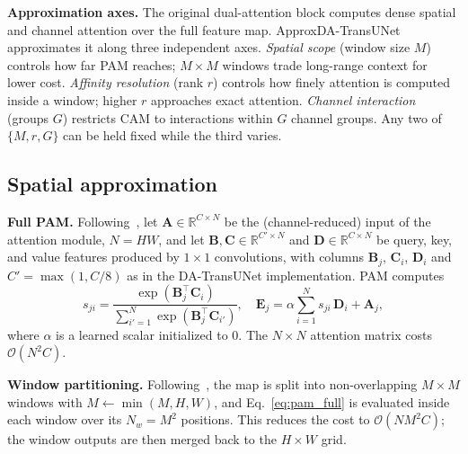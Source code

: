 \textbf{Approximation axes.} The original dual-attention block computes dense spatial and channel attention over the full feature map. ApproxDA-TransUNet approximates it along three independent axes. \emph{Spatial scope} (window size $M$) controls how far PAM reaches; $M{\times}M$ windows trade long-range context for lower cost. \emph{Affinity resolution} (rank $r$) controls how finely attention is computed inside a window; higher $r$ approaches exact attention. \emph{Channel interaction} (groups $G$) restricts CAM to interactions within $G$ channel groups. Any two of $\{M, r, G\}$ can be held fixed while the third varies.

\subsection{Spatial approximation}

\textbf{Full PAM.} Following~\cite{fu2019dual}, let $\mathbf{A} \in \mathbb{R}^{C \times N}$ be the (channel-reduced) input of the attention module, $N = HW$, and let $\mathbf{B}, \mathbf{C} \in \mathbb{R}^{C' \times N}$ and $\mathbf{D} \in \mathbb{R}^{C \times N}$ be query, key, and value features produced by $1{\times}1$ convolutions, with columns $\mathbf{B}_j$, $\mathbf{C}_i$, $\mathbf{D}_i$ and $C' = \max(1, C/8)$ as in the DA-TransUNet implementation. PAM computes
\begin{equation}
  s_{ji} = \frac{\exp(\mathbf{B}_j^{\top}\mathbf{C}_i)}{\sum_{i'=1}^{N}\exp(\mathbf{B}_j^{\top}\mathbf{C}_{i'})}, \quad
  \mathbf{E}_j = \alpha \sum_{i=1}^{N} s_{ji}\,\mathbf{D}_i + \mathbf{A}_j,
  \label{eq:pam_full}
\end{equation}
where $\alpha$ is a learned scalar initialized to 0. The $N{\times}N$ attention matrix costs $\mathcal{O}(N^2C)$.

\textbf{Window partitioning.} Following~\cite{liu2021swin}, the map is split into non-overlapping $M{\times}M$ windows with $M \leftarrow \min(M,H,W)$, and Eq.~\eqref{eq:pam_full} is evaluated inside each window over its $N_w = M^2$ positions. This reduces the cost to $\mathcal{O}(NM^2C)$; the window outputs are then merged back to the $H{\times}W$ grid.


